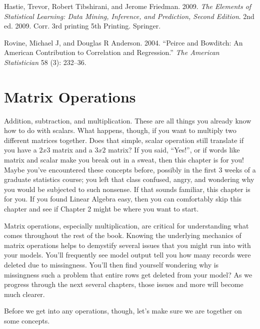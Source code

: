 \documentclass[
  letterpaper,
]{krantz}
\newlength{\cslhangindent}
\newlength{\cslentryspacingunit} %
\newenvironment{CSLReferences}[2] %
 {%
  \setlength{\parindent}{0pt}
  \ifodd #1
  \let\oldpar\par
  \def\par{\hangindent=\cslhangindent\oldpar}
  \fi
  \setlength{\parskip}{#2\cslentryspacingunit}
 }%
 {}
\begin{document}
\hypertarget{refs}{}
\begin{CSLReferences}{1}{0}
\leavevmode{}%
Hastie, Trevor, Robert Tibshirani, and Jerome Friedman. 2009. \emph{The
Elements of Statistical Learning: Data Mining, Inference, and
Prediction, Second Edition}. 2nd ed. 2009. Corr. 3rd printing 5th
Printing. Springer.

\leavevmode{}%
Rovine, Michael J, and Douglas R Anderson. 2004. {``Peirce and Bowditch:
An American Contribution to Correlation and Regression.''} \emph{The
American Statistician} 58 (3): 232--36.

\end{CSLReferences}

\chapter{Matrix Operations}\label{matrix-operations}

Addition, subtraction, and multiplication. These are all things you
already know how to do with scalars. What happens, though, if you want
to multiply two different matrices together. Does that simple, scalar
operation still translate if you have a \(2x3\) matrix and a \(3x2\)
matrix? If you said, ``Yes!'', or if words like matrix and scalar make
you break out in a sweat, then this chapter is for you! Maybe you've
encountered these concepts before, possibly in the first 3 weeks of a
graduate statistics course; you left that class confused, angry, and
wondering why you would be subjected to such nonsense. If that sounds
familiar, this chapter is for you. If you found Linear Algebra easy,
then you can comfortably skip this chapter and see if Chapter 2 might be
where you want to start.

Matrix operations, especially multiplication, are critical for
understanding what comes throughout the rest of the book. Knowing the
underlying mechanics of matrix operations helps to demystify several
issues that you might run into with your models. You'll frequently see
model output tell you how many records were deleted due to missingness.
You'll then find yourself wondering why is missingness such a problem
that entire rows get deleted from your model? As we progress through the
next several chapters, those issues and more will become much clearer.

Before we get into any operations, though, let's make sure we are
together on some concepts.
\end{document}
